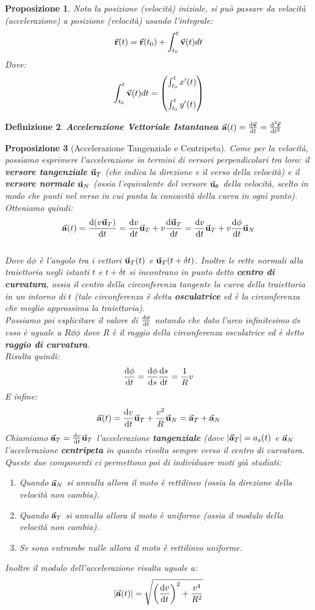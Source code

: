 \documentclass{article}
\newtheorem{defn}{Definizione}[section]
\newtheorem{prop}[defn]{Proposizione}
\renewcommand{\a}{\va{a}}
\renewcommand{\v}{\va{v}}
\renewcommand{\u}{\va{u}}
\renewcommand{\r}{\va{r}}
\begin{document}
\begin{prop}
Nota la posizione (velocità) iniziale, si può passare da velocità (accelerazione) a posizione (velocità) usando l'integrale:
\[\r(t)=\r(t_0)+\int_{t_0}^t\v(t)dt\]
Dove:
\[\int_{t_0}^t\v(t)dt=\begin{pmatrix}\int_{t_0}^tx'(t)\\ \\ \int_{t_0}^ty'(t)\end{pmatrix}\]
\end{prop}

\begin{defn}
\textbf{Accelerazione Vettoriale Istantanea} \(\a(t)=\dv{\v}{t}=\dv[2]{\r}{t}\)
\end{defn}

\begin{prop}[Accelerazione Tangenziale e Centripeta]
Come per la velocità, possiamo esprimere l'accelerazione in termini di versori perpendicolari tra loro: il \textbf{versore tangenziale} $\u_T$ (che indica la direzione e il verso della velocità) e il \textbf{versore normale} $\u_N$ (ossia l'equivalente del versore $\u_\theta$ della velocità, scelto in modo che punti nel verso in cui punta la concavità della curva in ogni punto). Otteniamo quindi:
\[\a(t)=\dv{(v\u_T)}{t}=\dv{v}{t}\u_T+v\dv{\u_T}{t}=\dv{v}{t}\u_T+v\dv{\phi}{t}\u_N\]\\
Dove $d\phi$ è l'angolo tra i vettori $\u_T(t)$ e $\u_T(t+\delta t)$. Inoltre le rette normali alla traiettoria negli istanti $t$ e $t+\delta t$ si incontrano in punto detto \textbf{centro di curvatura}, ossia il centro della circonferenza tangente la curva della traiettoria in un intorno di $t$ (tale circonferenza è detta \textbf{osculatrice} ed è la circonferenza che meglio approssima la traiettoria).\\
\hypertarget{velangolare}{Possiamo poi esplicitare il valore di $\dv{\phi}{t}$ notando che dato l'arco infinitesimo $\dd s$ esso è uguale a $R\dd \phi$ dove R è il raggio della circonferenza osculatrice ed è detto} \textbf{raggio di curvatura}.\\
Risulta quindi:
\[\dv{\phi}{t}=\dv{\phi}{s}\dv{s}{t}=\frac{1}{R}v\]
E infine:
\[\a(t)=\dv{v}{t}\u_T+\frac{v^2}{R}\u_N=\a_T+\a_N\]
Chiamiamo $\a_T=\dv{v}{t}\u_T$ l'accelerazione \textbf{tangenziale} (dove $|\a_T|=a_s(t)$ e $\a_N$ l'accelerazione \textbf{centripeta} in quanto rivolta sempre verso il centro di curvatura.\\
\linebreak
Queste due componenti ci permettono poi di individuare moti già studiati:
\begin{enumerate}
    \item Quando $\a_N$ si annulla allora il moto è rettilineo (ossia la direzione della velocità non cambia).
    \item Quando $\a_T$ si annulla allora il moto è uniforme (ossia il modulo della velocità non cambia).
    \item Se sono entrambe nulle allora il moto è rettilineo uniforme.
\end{enumerate}
Inoltre il modulo dell'accelerazione risulta uguale a:
\[|\a(t)|=\sqrt{\left(\dv{v}{t}\right)^2+\frac{v^4}{R^2}}\]
\end{prop}
\end{document}
